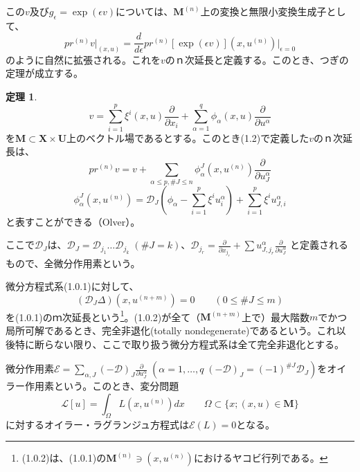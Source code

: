 \documentclass[a4paper, 11pt]{report}
\theoremstyle{definition}
\newtheorem{theorem}{定理}[section]
\begin{document}
 この$v$及び$g_{\epsilon}=\exp (\epsilon v)$については、$\mathbf{M}^{(n)}$上の変換と無限小変換生成子として、
\begin{equation*}
pr^{(n)}v\vert _{(x,u)} = \frac{d}{d\epsilon}pr^{(n)}[\exp (\epsilon v)](x,u^{(n)})\vert _{\epsilon=0}
\end{equation*}
のように自然に拡張される。これを$v$のｎ次延長と定義する。このとき、つぎの定理が成立する。

\begin{theorem}
\begin{equation*}
v=\sum^p_{i=1}\xi^i(x,u)\frac{\partial }{\partial x_i} + \sum^q_{\alpha=1}\phi_\alpha(x,u)\frac{\partial }{\partial u^\alpha}
\end{equation*}
を$\mathbf{M}\subset \mathbf{X}\times \mathbf{U}$上のベクトル場であるとする。このとき(1.2)で定義した$v$のｎ次延長は、
\begin{equation*}
pr^{(n)}v = v + \sum_{\alpha\leq p,\#J\leq n}\phi_\alpha^J(x,u^{(n)})\frac{\partial }{\partial u^\alpha_J}
\end{equation*}
\begin{equation*}
\phi_\alpha^J(x,u^{(n)}) = \mathcal{D}_J(\phi_\alpha - \sum^p_{i=1}\xi^iu^\alpha_i) + \sum^p_{i=1}\xi^iu^\alpha_{J,i}
\end{equation*}
と表すことができる（Olver\cite[Chap.2]{Olver4}）。
\end{theorem}

 ここで$\mathcal{D}_J$は、$\mathcal{D}_J=\mathcal{D}_{j_1}\dots\mathcal{D}_{j_k}\; (\#J=k)$、$\mathcal{D}_{j_r}=\frac{\partial }{\partial x_{j_r}}+\sum u^\alpha_{J,j_r}\frac{\partial }{\partial u^\alpha_J}$
と定義されるもので、全微分作用素という。

 微分方程式系(1.0.1)に対して、
\begin{equation}
(\mathcal{D}_J\varDelta)(x,u^{(n+m)}) = 0 \qquad (0\leq \#J\leq m) %
\end{equation}
を(1.0.1)のｍ次延長という\footnote{(1.0.2)は、(1.0.1)の$\mathbf{M}^{(n)}\ni (x,u^{(n)})$におけるヤコビ行列である。}。(1.0.2)が全て（$\mathbf{M}^{(n+m)}$上で）最大階数$m$でかつ局所可解であるとき、完全非退化(totally nondegenerate)であるという。これ以後特に断らない限り、ここで取り扱う微分方程式系は全て完全非退化とする。

 微分作用素$\mathcal{E}=\sum_{\alpha ,J} (-\mathcal{D})_J\frac{\partial }{\partial u^\alpha_J}\; (\alpha=1,\dots,q\; (-\mathcal{D})_J=(-1)^{\#J}\mathcal{D}_J)$をオイラー作用素という。このとき、変分問題
\begin{equation}
\mathcal{L}[u] = \int _\Omega L(x,u^{(n)})dx\qquad \Omega\subset \{ x;(x,u)\in \mathbf{M} \} %
\end{equation}
に対するオイラー・ラグランジュ方程式は$\mathcal{E}(L)=0$となる。
\end{document}
